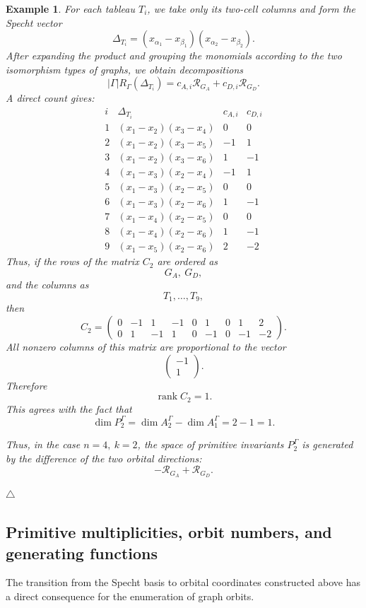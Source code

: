 \documentclass[12pt,reqno]{amsart}
\newtheorem{example}{Example}[section]
\begin{document}
\begin{example}
{For each tableau \(T_i\), we take only its two-cell columns and form the
Specht vector
$$
\Delta_{T_i}=(x_{\alpha_1}-x_{\beta_1})(x_{\alpha_2}-x_{\beta_2}).
$$
After expanding the product and grouping the monomials according to the two
isomorphism types of graphs, we obtain decompositions
$$
|\Gamma|R_\Gamma(\Delta_{T_i})
=
c_{A,i}\mathcal R_{G_A}
+
c_{D,i}\mathcal R_{G_D}.
$$
A direct count gives:
$$
\begin{array}{c|c|c|c}
i & \Delta_{T_i} & c_{A,i} & c_{D,i}\\
\hline
1 &(x_1-x_2)(x_3-x_4) & 0 & 0\\
2 &(x_1-x_2)(x_3-x_5) & -1 & 1\\
3 &(x_1-x_2)(x_3-x_6) & 1 & -1\\
4 &(x_1-x_3)(x_2-x_4) & -1 & 1\\
5 &(x_1-x_3)(x_2-x_5) & 0 & 0\\
6 &(x_1-x_3)(x_2-x_6) & 1 & -1\\
7 &(x_1-x_4)(x_2-x_5) & 0 & 0\\
8 &(x_1-x_4)(x_2-x_6) & 1 & -1\\
9 &(x_1-x_5)(x_2-x_6) & 2 & -2
\end{array}
$$
Thus, if the rows of the matrix \(C_2\) are ordered as
$$
G_A,\ G_D,
$$
and the columns as
$$
T_1,\dots,T_9,
$$
then
$$
C_2
=
\begin{pmatrix}
0&-1&1&-1&0&1&0&1&2\\
0&1&-1&1&0&-1&0&-1&-2
\end{pmatrix}.
$$
All nonzero columns of this matrix are proportional to the vector
$$
\begin{pmatrix}
-1\\
1
\end{pmatrix}.
$$
Therefore
$$
\operatorname{rank} C_2=1.
$$
This agrees with the fact that
$$
\dim P_2^\Gamma
=
\dim A_2^\Gamma-\dim A_1^\Gamma
=
2-1=1.
$$

Thus, in the case \(n=4,\ k=2\), the space of primitive invariants
\(P_2^\Gamma\) is generated by the difference of the two orbital directions:
$$
-\mathcal R_{G_A}+\mathcal R_{G_D}.
$$
}
$\triangle$
\end{example}

\subsection{Primitive multiplicities, orbit numbers, and generating functions}


The transition from the Specht basis to orbital coordinates constructed
above has a direct consequence for the enumeration of graph orbits.
\end{document}
